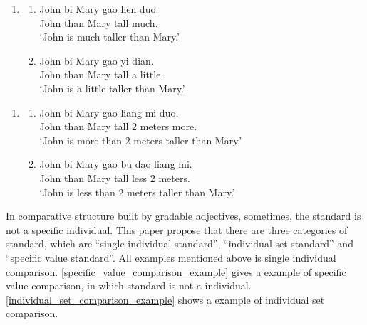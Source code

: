 \documentclass{ctexart}
\begin{document}
\begin{enumerate}
    \item
    \begin{enumerate}
        \item \label{dp_big_vague_example}
        John bi Mary gao hen duo.\\
        John than Mary tall much. \\
        `John is much taller than Mary.'

        \item \label{dp_small_vague_example}
        John bi Mary gao yi dian.\\
        John than Mary tall a little.\\
        `John is a little taller than Mary.'

    \end{enumerate}
\end{enumerate}

\begin{enumerate}
    \item
    \begin{enumerate}
        \item \label{dp_value_big_vague_example}
        John bi Mary gao liang mi duo.\\
        John than Mary tall 2 meters more. \\
        `John is more than 2 meters taller than Mary.'

        \item \label{dp_value_small_vague_example}
        John bi Mary gao bu dao liang mi.\\
        John than Mary tall less 2 meters. \\
        `John is less than 2 meters taller than Mary.'
    \end{enumerate}
\end{enumerate}

In comparative structure built by gradable adjectives, sometimes, the standard is not a specific individual. This paper propose that there are three categories of standard, which are ``single individual standard'', ``individual set standard'' and ``specific value standard''. All examples mentioned above is single individual comparison. \ref{specific_value_comparison_example} gives a example of specific value comparison, in which standard is not a individual. \ref{individual_set_comparison_example} shows a example of individual set comparison.
\end{document}
